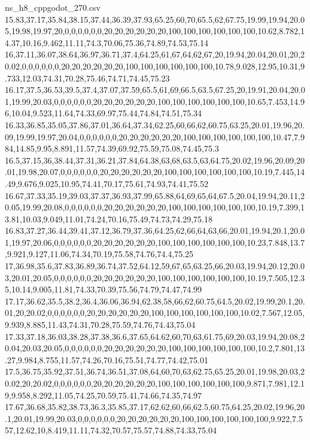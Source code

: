 \begin{filecontents*}[overwrite]{ns_h8_cppgodot_270.csv}
15.83,37.17,35.84,38.15,37.44,36.39,37.93,65.25,60,70,65.5,62,67.75,19.99,19.94,20.05,19.98,19.97,20,0,0,0,0,0,0,20,20,20,20,20,20,100,100,100,100,100,100,10.62,8.782,14.37,10.16,9.462,11.11,74.3,70.06,75.36,74.89,74.53,75.14
16,37.11,36.07,38.64,36.97,36.71,37.4,64.25,61,67,64,62,67,20,19.94,20.04,20.01,20,20.02,0,0,0,0,0,0,20,20,20,20,20,20,100,100,100,100,100,100,10.78,9.028,12.95,10.31,9.733,12.03,74.31,70.28,75.46,74.71,74.45,75.23
16.17,37.5,36.53,39.5,37.4,37.07,37.59,65.5,61,69,66.5,63.5,67.25,20,19.91,20.04,20.01,19.99,20.03,0,0,0,0,0,0,20,20,20,20,20,20,100,100,100,100,100,100,10.65,7.453,14.96,10.04,9.523,11.64,74.33,69.97,75.44,74.84,74.51,75.34
16.33,36.85,35.05,37.86,37.01,36.64,37.34,62.25,60,66,62,60.75,63.25,20.01,19.96,20.09,19.99,19.97,20.04,0,0,0,0,0,0,20,20,20,20,20,20,100,100,100,100,100,100,10.47,7.984,14.85,9.95,8.891,11.57,74.39,69.92,75.59,75.08,74.45,75.3
16.5,37.15,36,38.44,37.31,36.21,37.84,64.38,63,68,63.5,63,64.75,20.02,19.96,20.09,20.01,19.98,20.07,0,0,0,0,0,0,20,20,20,20,20,20,100,100,100,100,100,100,10.19,7.445,14.49,9.676,9.025,10.95,74.41,70.17,75.61,74.93,74.41,75.52
16.67,37.33,35.19,39.03,37.37,36.93,37.99,65.88,64,69,65,64,67.5,20.04,19.94,20.11,20.05,19.99,20.08,0,0,0,0,0,0,20,20,20,20,20,20,100,100,100,100,100,100,10.19,7.399,13.81,10.03,9.049,11.01,74.24,70.16,75.49,74.73,74.29,75.18
16.83,37.27,36.44,39.41,37.12,36.79,37.36,64.25,62,66,64,63,66,20.01,19.94,20.1,20.01,19.97,20.06,0,0,0,0,0,0,20,20,20,20,20,20,100,100,100,100,100,100,10.23,7.848,13.7,9.921,9.127,11.06,74.34,70.19,75.58,74.76,74.4,75.25
17,36.98,35.6,37.83,36.89,36.74,37.52,64.12,59,67,65,63.25,66,20.03,19.94,20.12,20.03,20.01,20.05,0,0,0,0,0,0,20,20,20,20,20,20,100,100,100,100,100,100,10.19,7.505,12.35,10.14,9.005,11.81,74.33,70.39,75.56,74.79,74.47,74.99
17.17,36.62,35.5,38.2,36.4,36.06,36.94,62.38,58,66,62,60.75,64.5,20.02,19.99,20.1,20.01,20,20.02,0,0,0,0,0,0,20,20,20,20,20,20,100,100,100,100,100,100,10.02,7.567,12.05,9.939,8.885,11.43,74.31,70.28,75.59,74.76,74.43,75.04
17.33,37.18,36.03,38.28,37.38,36.6,37.65,64.62,60,70,63,61.75,69,20.03,19.94,20.08,20.04,20.03,20.05,0,0,0,0,0,0,20,20,20,20,20,20,100,100,100,100,100,100,10.2,7.801,13.27,9.984,8.755,11.57,74.26,70.16,75.51,74.77,74.42,75.01
17.5,36.75,35.92,37.51,36.74,36.51,37.08,64,60,70,63,62.75,65.25,20.01,19.98,20.03,20.02,20,20.02,0,0,0,0,0,0,20,20,20,20,20,20,100,100,100,100,100,100,9.871,7.981,12.19,9.958,8.292,11.05,74.25,70.59,75.41,74.66,74.35,74.97
17.67,36.68,35.82,38.73,36.3,35.85,37.17,62.62,60,66,62.5,60.75,64.25,20.02,19.96,20.1,20.01,19.99,20.03,0,0,0,0,0,0,20,20,20,20,20,20,100,100,100,100,100,100,9.922,7.557,12.62,10,8.419,11.11,74.32,70.57,75.57,74.88,74.33,75.04

\end{filecontents*}
